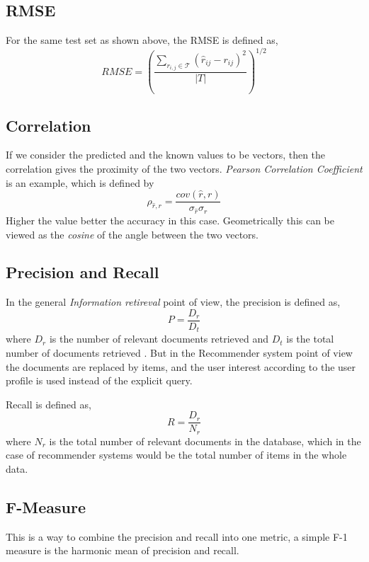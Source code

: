 \subsection{RMSE}
For the same test set as shown above, the RMSE is defined as, 
\begin{equation}
  RMSE =\left(
\frac{\sum_{r_{i,j}\in{\mathcal{T}}}{(\hat{r}_{ij}-r_{ij})^2}}{|T|}\right)^{1/2}
\end{equation}

\subsection{Correlation}
If we consider the predicted and the known values to be vectors, then the
correlation gives the proximity of the two vectors. \emph{Pearson Correlation
Coefficient} is an example, which is defined by
\begin{equation}
 \rho_{\hat{r},r}=\frac{cov(\hat{r},r)}{\sigma_{\hat{r}}\sigma_r}
\end{equation}
Higher the value better the accuracy in this case. Geometrically this can be
viewed as the \emph{cosine} of the angle between the two vectors. 

\subsection{Precision and Recall}
In the general \emph{Information retireval} point of view, the precision is
defined as,
\begin{equation}
 P=\frac{D_r}{D_t}
\end{equation}
where $D_r$ is the number of relevant documents retrieved and $D_t$ is the total
number of documents retrieved \cite{eld-mm:07}. But in the
Recommender system point of view the documents are replaced by items, and the
user interest according to the user profile is used instead of the explicit
query. 

Recall is defined as,
\begin{equation}
 R=\frac{D_r}{N_r}
\end{equation}
where $N_r$ is the total number of relevant documents in the database, which in
the case of recommender systems would be the total number of items in the whole
data.

\subsection{F-Measure}
This is a way to combine the precision and recall into one metric, a simple F-1
measure is the harmonic mean of precision and recall. 












